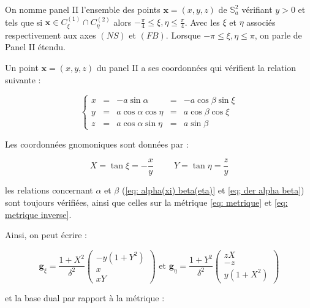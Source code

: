 \begin{definition}
On nomme panel II l'ensemble des points $\mathbf{x}=(x,y,z)$ de $\mathbb{S}_a^2$ vérifiant $y>0$ et tels que si $\mathbf{x} \in C_{\xi}^{(1)} \cap C_{\eta}^{(2)}$ alors $-\frac{\pi}{4}\leq \xi,\eta \leq \frac{\pi}{4}$. Avec les $\xi$ et $\eta$ associés respectivement aux axes $(NS)$ et $(FB)$. Lorsque $-\pi \leq \xi,\eta \leq \pi$, on parle de Panel II étendu.
\end{definition}

Un point $\mathbf{x}=(x,y,z)$ du panel II a ses coordonnées qui vérifient la relation suivante :

\begin{equation}
\left\lbrace
\begin{array}{rcccc}
x & = & - a \sin \alpha & = & - a \cos \beta \sin \xi \\
y & = & a \cos \alpha \cos \eta & = & a \cos \beta \cos \xi \\
z & = & a \cos \alpha \sin \eta & = & a \sin \beta
\end{array}
\right.
\end{equation}

Les coordonnées gnomoniques sont données par :

\begin{equation}
X = \tan \xi = - \dfrac{x}{y} \hspace{1cm} Y = \tan \eta = \dfrac{z}{y}
\end{equation}

les relations concernant $\alpha$ et $\beta$ (\eqref{eq: alpha(xi) beta(eta)} et \eqref{eq; der alpha beta}) sont toujours vérifiées, ainsi que celles sur la métrique \eqref{eq: metrique} et \eqref{eq: metrique inverse}.

Ainsi, on peut écrire : 

\begin{equation}
\mathbf{g}_{\xi} = \dfrac{1+X^2}{\delta^2} \begin{pmatrix}
-y(1+Y^2) \\ x \\ xY
\end{pmatrix} \text{ et } \mathbf{g}_{\eta} = \dfrac{1+Y^2}{\delta^2} \begin{pmatrix}
zX \\ -z \\ y(1+X^2)
\end{pmatrix}
\label{eq: base locale II}
\end{equation}

et la base dual par rapport à la métrique :

